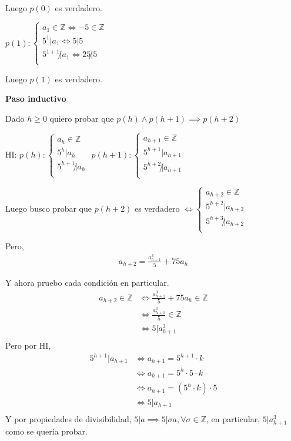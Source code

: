 Luego $ p(0) $ es verdadero.

$ p(1): \begin{cases}
    a_1 \in \mathbb{Z} \iff -5 \in \mathbb{Z} \\
    5^1 | a_1 \iff 5 | 5 \\
    5^{1+1} \not | a_1 \iff 25 \not | 5 \\
\end{cases} $

Luego $ p(1) $ es verdadero.

\textbf{Paso inductivo}

Dado $ h \geq 0 $ quiero probar que $ p(h) \wedge p(h+1) \implies p(h+2) $

HI: $ p(h): \begin{cases}
    a_h \in \mathbb{Z} \\
    5^h | a_h \\
    5^{h+1} \not | a_h \\
\end{cases} $
$ p(h+1): \begin{cases}
    a_{h+1} \in \mathbb{Z} \\
    5^{h+1} | a_{h+1} \\
    5^{h+2} \not | a_{h+1} \\
\end{cases} $

Luego busco probar que $ p(h+2) $ es verdadero $ \iff \begin{cases}
    a_{h+2} \in \mathbb{Z} \\
    5^{h+2} | a_{h+2} \\
    5^{h+3} \not | a_{h+2} \\
\end{cases} $

Pero,
\begin{align*}
    a_{h+2} = \frac{a_{h+1}^3}{5} + 75a_h
\end{align*}

Y ahora pruebo cada condición en particular.
\begin{align*}
    a_{h+2} \in \mathbb{Z} &\iff \frac{a_{h+1}^3}{5} + 75a_h \in \mathbb{Z} \\
    &\iff \frac{a_{h+1}^3}{5} \in \mathbb{Z} \\
    &\iff 5|a_{h+1}^3 \\
\end{align*}
Pero por HI,
\begin{align*}
    5^{h+1} | a_{h+1} &\iff a_{h+1} = 5^{h+1} \cdot k \\
    &\iff a_{h+1} = 5^h \cdot 5 \cdot k \\
    &\iff a_{h+1} = (5^h \cdot k) \cdot 5 \\
    &\iff 5|a_{h+1} \\
\end{align*}
Y por propiedades de divisibilidad, $ 5|a \implies 5|\sigma a, \forall \sigma \in \mathbb{Z} $, en particular, $ 5 | a_{h+1}^3 $ como se quería probar.

